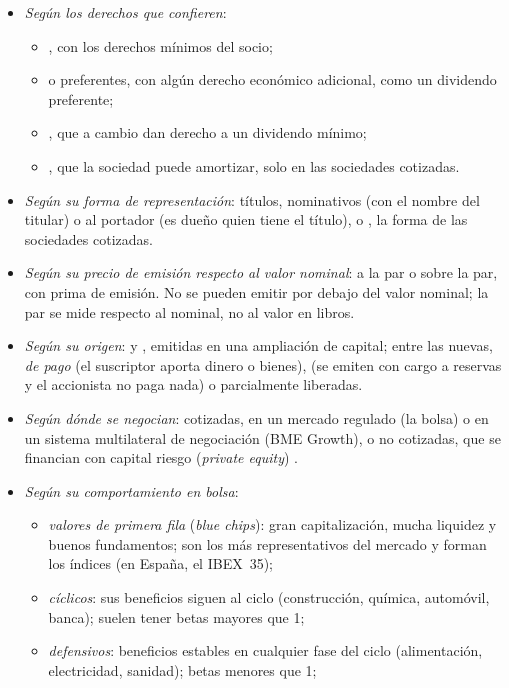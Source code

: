\documentclass[11pt]{article}
\begin{document}
\begin{itemize}
\item \emph{Según los derechos que confieren}:
  \begin{itemize}
  \item {}, con los derechos mínimos del socio;
  \item {} o preferentes, con algún derecho económico adicional, como un dividendo preferente;
  \item {}, que a cambio dan derecho a un dividendo mínimo\nocite{LSC2010};
  \item {}, que la sociedad puede amortizar, solo en las sociedades cotizadas\nocite{LSC2010}.
  \end{itemize}
\item \emph{Según su forma de representación}: títulos, nominativos (con el nombre del titular) o al portador (es dueño quien tiene el título), o , la forma de las sociedades cotizadas.
\item \emph{Según su precio de emisión respecto al valor nominal}: a la par o sobre la par, con prima de emisión. No se pueden emitir por debajo del valor nominal\nocite{LSC2010}; la par se mide respecto al nominal, no al valor en libros.
\item \emph{Según su origen}:  y , emitidas en una ampliación de capital; entre las nuevas, \emph{de pago} (el suscriptor aporta dinero o bienes),  (se emiten con cargo a reservas y el accionista no paga nada) o parcialmente liberadas.
\item \emph{Según dónde se negocian}: cotizadas, en un mercado regulado (la bolsa) o en un sistema multilateral de negociación (BME Growth), o no cotizadas, que se financian con capital riesgo (\emph{private equity}) .
\item \emph{Según su comportamiento en bolsa}:
  \begin{itemize}
  \item \emph{valores de primera fila} (\emph{blue chips}): gran capitalización, mucha liquidez y buenos fundamentos; son los más representativos del mercado y forman los índices (en España, el IBEX~35);
  \item \emph{cíclicos}: sus beneficios siguen al ciclo (construcción, química, automóvil, banca); suelen tener betas mayores que 1;
  \item \emph{defensivos}: beneficios estables en cualquier fase del ciclo (alimentación, electricidad, sanidad); betas menores que 1;

\end{itemize}
\end{itemize}
\end{document}
